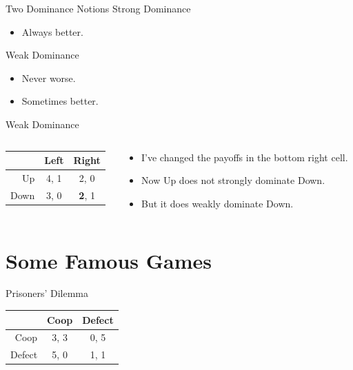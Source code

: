 \documentclass[
  14pt,
  letterpaper,
  ignorenonframetext,
  aspectratio=169,
]{beamer}
\providecommand{\tightlist}{%
  \setlength{\itemsep}{0pt}\setlength{\parskip}{0pt}}\usepackage{longtable,booktabs,array}
\let\olditem\item
\renewcommand{\item}{%
\olditem\vspace{6pt}}
\begin{document}
\begin{frame}{Two Dominance Notions}
\protect\hypertarget{two-dominance-notions}{}
Strong Dominance

\begin{itemize}
\tightlist
\item
  Always better.
\end{itemize}

Weak Dominance

\begin{itemize}
\tightlist
\item
  Never worse.
\item
  Sometimes better.
\end{itemize}
\end{frame}

\begin{frame}[fragile]{Weak Dominance}
\protect\hypertarget{weak-dominance-1}{}
\begin{columns}[T]
\begin{column}{0.4\textwidth}
\begin{table}[!h]
\centering
\begin{tabular}[t]{>{}r|cc}
\toprule
 & Left & Right\\
\midrule
Up & 4, 1 & 2, 0\\
Down & 3, 0 & \textbf{2}, 1\\
\bottomrule
\end{tabular}
\end{table}
\end{column}

\begin{column}{0.6\textwidth}
\begin{itemize}
\tightlist
\item
  I've changed the payoffs in the bottom right cell.
\item
  Now Up does not strongly dominate Down.
\item
  But it does weakly dominate Down.
\end{itemize}
\end{column}
\end{columns}
\end{frame}

\hypertarget{some-famous-games}{%
\section{Some Famous Games}\label{some-famous-games}}

\begin{frame}[fragile]{Prisoners' Dilemma}
\protect\hypertarget{prisoners-dilemma}{}
\begin{table}[!h]
\centering
\begin{tabular}[t]{>{}r|cc}
\toprule
 & Coop & Defect\\
\midrule
Coop & 3, 3 & 0, 5\\
Defect & 5, 0 & 1, 1\\
\bottomrule
\end{tabular}
\end{table}
\end{frame}
\end{document}

